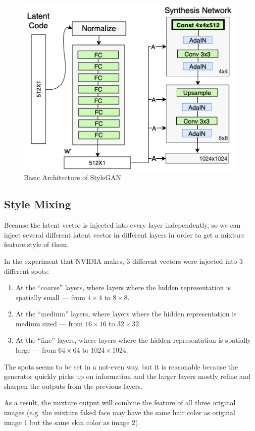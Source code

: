 \documentclass{article} %
\begin{document}
\begin{figure}[h]
	\centering
	\includegraphics[width=0.7\linewidth]{figures/Constant-input.png}
	\caption{Basic Architecture of StyleGAN}
	\label{fig:BasicArchitectureofStyleGAN}
\end{figure}

\subsection{Style Mixing}

Because the latent vector is injected into every layer independently, so we can inject several different latent vector in different layers in order to get a mixture feature style of them.

In the experiment that NVIDIA makes, 3 different vectors were injected into 3 different spots:

\begin{enumerate}
    \item At the “coarse” layers, where layers where the hidden representation is spatially small — from $4 \times 4$ to $8 \times 8$.
    \item At the “medium” layers, where layers where the hidden representation is medium sized — from $16 \times 16$ to $32 \times 32$.
    \item At the “fine” layers, where layers where the hidden representation is spatially large — from $64 \times 64$ to $1024 \times 1024$.
\end{enumerate}

The spots seems to be set in a not-even way, but it is reasonable because the generator quickly picks up on information and the larger layers mostly refine and sharpen the outputs from the previous layers.

As a result, the mixture output will combine the feature of all three original images (e.g. the mixture faked face may have the same hair color as original image 1 but the same skin color as image 2).
\end{document}
